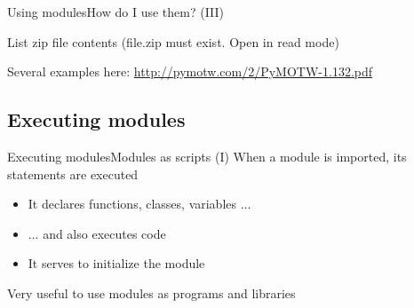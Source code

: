 \documentclass[10pt,compress]{beamer} %
\begin{document}
\begin{frame}[fragile]{Using modules}{How do I use them?  (III)}
	\vspace{-0.2cm}
	\begin{block}{List zip file contents (file.zip must exist. Open in read mode)}
	\vspace{-0.2cm}
	
	\vspace{-0.2cm}
	\end{block}
	
	\vspace{-0.2cm}
	\centering \footnotesize{Several examples here: \url{http://pymotw.com/2/PyMOTW-1.132.pdf}}
\end{frame}

\subsection{Executing modules}

\begin{frame}{Executing modules}{Modules as scripts (I)}
	When a module is imported, its statements are executed
		\begin{itemize}
		\item It declares functions, classes, variables ...
		\item ... and also executes code
		\item It serves to initialize the module
		\end{itemize}
	Very useful to use modules as programs and libraries
\end{frame}
\end{document}
